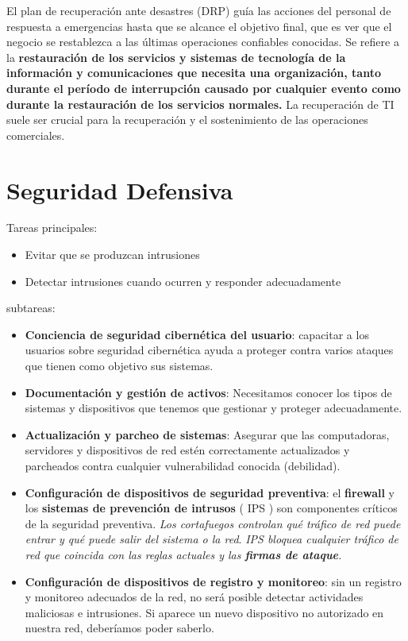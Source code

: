 El plan de recuperación ante desastres (DRP) guía las acciones del personal de respuesta a emergencias hasta que se alcance el objetivo final, que es ver que el negocio se restablezca a las últimas operaciones confiables conocidas. Se refiere a la \textbf{restauración de los servicios y sistemas de tecnología de la información y comunicaciones que necesita una organización, tanto durante el período de interrupción causado por cualquier evento como durante la restauración de los servicios normales.} La recuperación de TI suele ser crucial para la recuperación y el sostenimiento de las operaciones comerciales. 














\section{Seguridad Defensiva}
\color{blue}
Tareas principales:
\begin{itemize}
\item Evitar que se produzcan intrusiones
\item Detectar intrusiones cuando ocurren y responder adecuadamente
\end{itemize}

subtareas:

\begin{itemize}
\item \textbf{Conciencia de seguridad cibernética del usuario}: capacitar a los usuarios sobre seguridad cibernética ayuda a proteger contra varios ataques que tienen como objetivo sus sistemas.
\item \textbf{Documentación y gestión de activos}: Necesitamos conocer los tipos de sistemas y dispositivos que tenemos que gestionar y proteger adecuadamente.
\item \textbf{Actualización y parcheo de sistemas}: Asegurar que las computadoras, servidores y dispositivos de red estén correctamente actualizados y parcheados contra cualquier vulnerabilidad conocida (debilidad).
\item  \textbf{Configuración de dispositivos de seguridad preventiva}: el \textbf{firewall} y los \textbf{sistemas de prevención de intrusos} ( IPS ) son componentes críticos de la seguridad preventiva. \textit{Los cortafuegos controlan qué tráfico de red puede entrar y qué puede salir del sistema o la red}. \textit{IPS bloquea cualquier tráfico de red que coincida con las reglas actuales y las \textbf{firmas de ataque}.}
\item  \textbf{Configuración de dispositivos de registro y monitoreo}: sin un registro y monitoreo adecuados de la red, no será posible detectar actividades maliciosas e intrusiones. Si aparece un nuevo dispositivo no autorizado en nuestra red, deberíamos poder saberlo.
\end{itemize}
\color{black}




